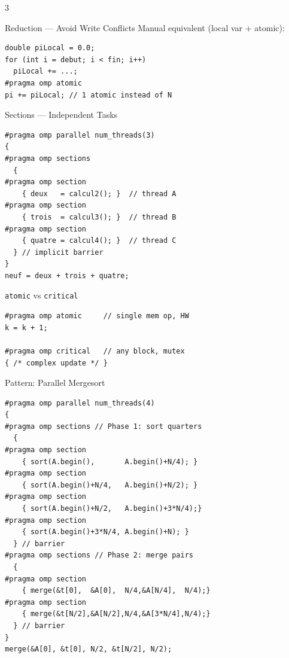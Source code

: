 \documentclass[8pt,a4paper,landscape]{article}
\begin{document}
\begin{multicols}{3}
\begin{highlightbox}{Reduction --- Avoid Write Conflicts}
{\scriptsize\color{cmt} Manual equivalent (local var + atomic):}
\begin{lstlisting}
double piLocal = 0.0;
for (int i = debut; i < fin; i++)
  piLocal += ...;
#pragma omp atomic
pi += piLocal; // 1 atomic instead of N
\end{lstlisting}
\end{highlightbox}

\begin{sectionbox}{Sections --- Independent Tasks}
\begin{lstlisting}
#pragma omp parallel num_threads(3)
{
#pragma omp sections
  {
#pragma omp section
    { deux   = calcul2(); }  // thread A
#pragma omp section
    { trois  = calcul3(); }  // thread B
#pragma omp section
    { quatre = calcul4(); }  // thread C
  } // implicit barrier
}
neuf = deux + trois + quatre;
\end{lstlisting}
\end{sectionbox}

\begin{sectionbox}{\texttt{atomic} vs \texttt{critical}}
\begin{lstlisting}
#pragma omp atomic     // single mem op, HW
k = k + 1;

#pragma omp critical   // any block, mutex
{ /* complex update */ }
\end{lstlisting}
\end{sectionbox}

\begin{accentbox}{Pattern: Parallel Mergesort}
\begin{lstlisting}
#pragma omp parallel num_threads(4)
{
#pragma omp sections // Phase 1: sort quarters
  {
#pragma omp section
    { sort(A.begin(),       A.begin()+N/4); }
#pragma omp section
    { sort(A.begin()+N/4,   A.begin()+N/2); }
#pragma omp section
    { sort(A.begin()+N/2,   A.begin()+3*N/4);}
#pragma omp section
    { sort(A.begin()+3*N/4, A.begin()+N); }
  } // barrier
#pragma omp sections // Phase 2: merge pairs
  {
#pragma omp section
    { merge(&t[0],  &A[0],  N/4,&A[N/4],  N/4);}
#pragma omp section
    { merge(&t[N/2],&A[N/2],N/4,&A[3*N/4],N/4);}
  } // barrier
}
merge(&A[0], &t[0], N/2, &t[N/2], N/2);
\end{lstlisting}
\end{accentbox}

\end{multicols}

\newpage

\begin{center}
\colorbox{titlebg}{}
\end{center}
\vspace{2mm}
\end{document}
